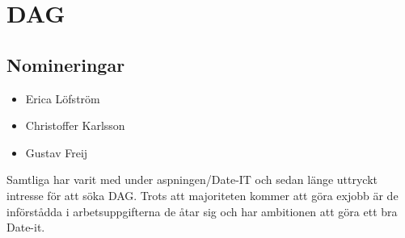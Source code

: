 \section{DAG}



\subsection{Nomineringar}

\begin{autoframe}
\begin{itemize}
\item Erica Löfström
\item Christoffer Karlsson
\item Gustav Freij
\end{itemize}


\bigskip
Samtliga har varit med under aspningen/Date-IT och sedan länge uttryckt intresse för att söka DAG. Trots att majoriteten kommer att göra exjobb är de införstådda i arbetsuppgifterna de åtar sig och har ambitionen att göra ett bra Date-it. 
\end{autoframe}
